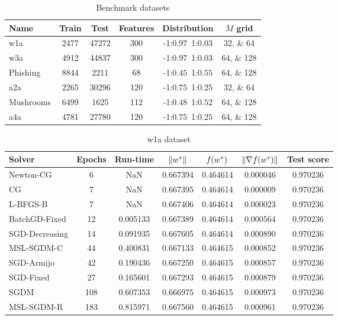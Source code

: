 \begin{table}
\centering
\caption{Benchmark datasets}
\label{tab:datasets}
\begin{tabular}{lSSScc}
\toprule
Name & {Train} & {Test} & {Features} & {Distribution} & {$M$ grid} \\
\midrule
w1a & 2477 & 47272 & 300 & -1:$0.97$\,\,\,1:$0.03$ &
\numlist[list-pair-separator={, }]{32;64} \\
w3a & 4912 & 44837 & 300 & -1:$0.97$\,\,\,1:$0.03$ &
\numlist[list-pair-separator={, }]{64;128} \\
Phishing & 8844 & 2211 & 68 & -1:$0.45$\,\,\,1:$0.55$ &
\numlist[list-pair-separator={, }]{64;128} \\
a2a & 2265 & 30296 & 120 & -1:$0.75$\,\,\,1:$0.25$ &
\numlist[list-pair-separator={, }]{32;64} \\
Mushrooms & 6499 & 1625 & 112 & -1:$0.48$\,\,\,1:$0.52$ &
\numlist[list-pair-separator={, }]{64;128} \\
a4a & 4781 & 27780 & 120 & -1:$0.75$\,\,\,1:$0.25$ &
\numlist[list-pair-separator={, }]{64;128} \\
\bottomrule
\end{tabular}
\end{table}

\cleardoublepage

\begin{table}
\centering
\caption{w1a dataset}
\label{tab:w1a-table}
\begin{tabular}{lS[drop-zero-decimal]S[round-precision=4]S[round-precision=6]S[round-precision=6]S[exponent-mode=scientific]S[round-precision=6]}
\toprule
Solver & {Epochs} & {Run-time} & {$\lVert w^\ast\rVert$} & {$\operatorname*{\mathit{f}}(w^\ast)$} & {$\lVert\nabla f(w^\ast)\rVert$} & {Test score} \\
\midrule
Newton-CG & 6 & NaN & 0.667394 & 0.464614 & 0.000046 & 0.970236 \\
CG & 7 & NaN & 0.667395 & 0.464614 & 0.000009 & 0.970236 \\
L-BFGS-B & 7 & NaN & 0.667406 & 0.464614 & 0.000023 & 0.970236 \\
BatchGD-Fixed & 12 & 0.005133 & 0.667389 & 0.464614 & 0.000564 & 0.970236 \\
SGD-Decreasing & 14 & 0.091935 & 0.667605 & 0.464614 & 0.000890 & 0.970236 \\
MSL-SGDM-C & 44 & 0.400831 & 0.667133 & 0.464615 & 0.000852 & 0.970236 \\
SGD-Armijo & 42 & 0.190436 & 0.667250 & 0.464615 & 0.000857 & 0.970236 \\
SGD-Fixed & 27 & 0.165601 & 0.667293 & 0.464615 & 0.000879 & 0.970236 \\
SGDM & 108 & 0.607353 & 0.666975 & 0.464615 & 0.000973 & 0.970236 \\
MSL-SGDM-R & 183 & 0.815971 & 0.667560 & 0.464615 & 0.000961 & 0.970236 \\
\bottomrule
\end{tabular}
\end{table}

